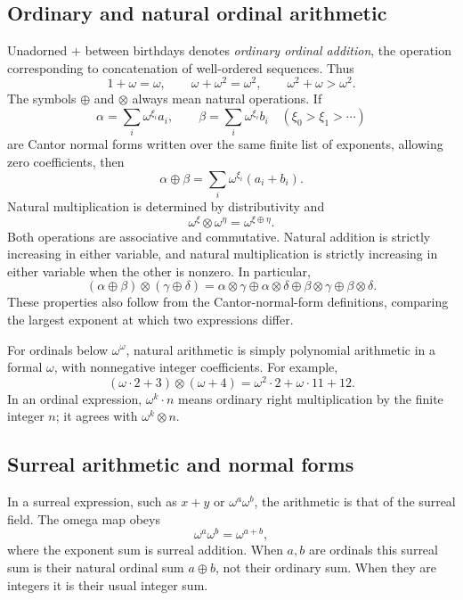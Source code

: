 \documentclass[11pt,letterpaper]{article}
\numberwithin{equation}{section}
\theoremstyle{definition}
\theoremstyle{remark}
\newcommand{\ns}{\mathbin{\oplus}}
\newcommand{\np}{\mathbin{\otimes}}
\begin{document}
\subsection{Ordinary and natural ordinal arithmetic}
Unadorned $+$ between birthdays denotes \emph{ordinary ordinal addition}, the
operation corresponding to concatenation of well-ordered sequences. Thus
\[
 1+\omega=\omega,\qquad
 \omega+\omega^2=\omega^2,
 \qquad\omega^2+\omega>\omega^2.
\]
The symbols $\oplus$ and $\otimes$ always mean natural operations. If
\[
 \alpha=\sum_i\omega^{\xi_i}a_i,\qquad
 \beta=\sum_i\omega^{\xi_i}b_i
 \quad(\xi_0>\xi_1>\cdots)
\]
are Cantor normal forms written over the same finite list of exponents,
allowing zero coefficients, then
\[
 \alpha\ns\beta=\sum_i\omega^{\xi_i}(a_i+b_i).
\]
Natural multiplication is determined by distributivity and
\begin{equation}\label{eq:natmonomial}
 \omega^\xi\np\omega^\eta=\omega^{\xi\ns\eta}.
\end{equation}
Both operations are associative and commutative. Natural addition is strictly
increasing in either variable, and natural multiplication is strictly increasing
in either variable when the other is nonzero. In particular,
\[
 (\alpha\ns\beta)\np(\gamma\ns\delta)
 =\alpha\np\gamma\ns\alpha\np\delta
  \ns\beta\np\gamma\ns\beta\np\delta.
\]
These properties also follow from the Cantor-normal-form definitions, comparing
the largest exponent at which two expressions differ.

For ordinals below $\omega^\omega$, natural arithmetic is simply polynomial
arithmetic in a formal $\omega$, with nonnegative integer coefficients. For
example,
\[
 (\omega\cdot2+3)\np(\omega+4)
 =\omega^2\cdot2+\omega\cdot11+12.
\]
In an ordinal expression, $\omega^k\cdot n$ means ordinary right multiplication
by the finite integer $n$; it agrees with $\omega^k\otimes n$.

\subsection{Surreal arithmetic and normal forms}
In a surreal expression, such as $x+y$ or $\omega^a\omega^b$, the arithmetic
is that of the surreal field. The omega map obeys
\begin{equation}\label{eq:omega-field}
 \omega^a\omega^b=\omega^{a+b},
\end{equation}
where the exponent sum is surreal addition. When $a,b$ are ordinals this
surreal sum is their natural ordinal sum $a\oplus b$, not their ordinary sum.
When they are integers it is their usual integer sum.
\end{document}
